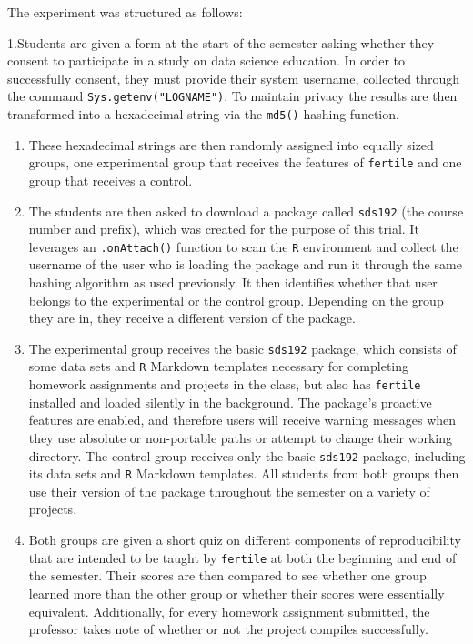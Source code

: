 \documentclass[12pt,twoside]{reedthesis}
\begin{document}
The experiment was structured as follows:

1.Students are given a form at the start of the semester asking whether
they consent to participate in a study on data science education. In
order to successfully consent, they must provide their system username,
collected through the command \texttt{Sys.getenv("LOGNAME")}. To
maintain privacy the results are then transformed into a hexadecimal
string via the \texttt{md5()} hashing function.
\begin{enumerate}
\def\labelenumi{\arabic{enumi}.}
\setcounter{enumi}{1}
\item
  These hexadecimal strings are then randomly assigned into equally
  sized groups, one experimental group that receives the features of
  \texttt{fertile} and one group that receives a control.
\item
  The students are then asked to download a package called
  \texttt{sds192} (the course number and prefix), which was created for
  the purpose of this trial. It leverages an \texttt{.onAttach()}
  function to scan the \texttt{R} environment and collect the username
  of the user who is loading the package and run it through the same
  hashing algorithm as used previously. It then identifies whether that
  user belongs to the experimental or the control group. Depending on
  the group they are in, they receive a different version of the
  package.
\item
  The experimental group receives the basic \texttt{sds192} package,
  which consists of some data sets and \texttt{R} Markdown templates
  necessary for completing homework assignments and projects in the
  class, but also has \texttt{fertile} installed and loaded silently in
  the background. The package's proactive features are enabled, and
  therefore users will receive warning messages when they use absolute
  or non-portable paths or attempt to change their working directory.
  The control group receives only the basic \texttt{sds192} package,
  including its data sets and \texttt{R} Markdown templates. All
  students from both groups then use their version of the package
  throughout the semester on a variety of projects.
\item
  Both groups are given a short quiz on different components of
  reproducibility that are intended to be taught by \texttt{fertile} at
  both the beginning and end of the semester. Their scores are then
  compared to see whether one group learned more than the other group or
  whether their scores were essentially equivalent. Additionally, for
  every homework assignment submitted, the professor takes note of
  whether or not the project compiles successfully.
\end{enumerate}
\end{document}
